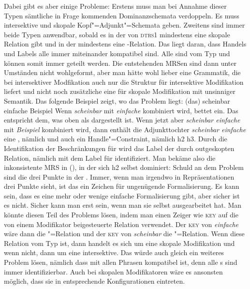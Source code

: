 Dabei gibt es aber einige Probleme: Erstens muss man bei Annahme dieser Typen sämtliche
in Frage kommenden Dominanzschemata verdoppeln. Es muss intersektive und skopale
Kopf"=Adjunkt"=Schemata geben. Zweitens sind immer beide Typen anwendbar, sobald es in der \relsl
von \textsc{dtrs1} mindestens eine skopale Relation gibt und in der \hconsl mindestens eine
\qeq-Relation. Das liegt daran, dass Handels und Labels alle immer miteinander kompatibel sind. Alle
sind vom Typ  und können somit immer geteilt werden. Die
entstehenden MRSen sind dann unter Umständen nicht wohlgeformt, aber man hätte wohl lieber eine
Grammatik, die bei intersektiver Modfikation auch nur die Struktur für intersektive Modifikation
liefert und nicht noch zusätzliche eine für skopale Modifikation mit unsinniger Semantik. Das
folgende Beispiel zeigt, wo das Problem liegt:
\eal
\ex (das) scheinbar einfache Beispiel
\ex {}
\zl
Wenn \emph{scheinbar} mit \emph{einfache} kombiniert wird, bettet 
 ein. Das entspricht dem, was oben als  dargestellt ist. Wenn
jetzt aber \emph{scheinbar einfache} mit \emph{Beispiel} kombiniert wird, dann enthält die
Adjunkttochter \emph{scheinbar einfache} eine , nämlich  und
auch ein Handle"=Constraint, nämlich h2 \qeq h3. Durch die Identifikation der Beschränkungen für
 wird das Label der durch  outgeskopten Relation, nämlich
 mit dem Label für  identifiziert. Man bekäme also die
inkonsistente MRS in (), in der sich h2 selbst dominiert:
\ea
{}
\z
Schuld an dem Problem sind die drei Punkte in der \relsl. Immer, wenn man irgendwo in Repräsentationen drei Punkte
sieht, ist das ein Zeichen für ungenügende Formalisierung. Es kann sein, dass es eine mehr oder
wenige einfache Formalisierung gibt, aber sicher ist es nicht. Sicher kann man erst sein, wenn man
sie selbst ausgearbeitet hat. Man könnte diesen Teil des Problems lösen, indem man einen Zeiger wie
\textsc{key} auf die von einem Modifikator beigesteuerte Relation verwendet. Der \textsc{key} von \emph{einfache} wäre
dann die "=Relation und der \textsc{key} von \emph{scheinbar} die
"=Relation. Wenn diese Relation vom Typ  ist, dann handelt es
sich um eine skopale Modifikation und wenn nicht, dann um eine intersektive. Das würde auch gleich
ein weiteres Problem lösen, nämlich dass  mit allen Phrasen kompatibel
ist, denn alle \ltop{}s sind immer identifizierbar. Auch bei skopalen Modifikatoren wäre es
ansonsten möglich, dass sie in entsprechende Konfigurationen eintreten. 

